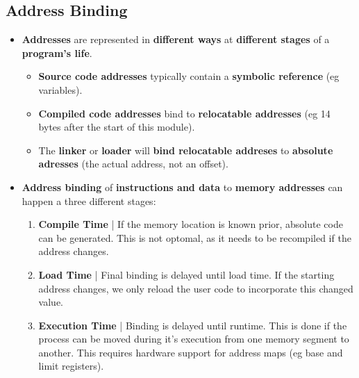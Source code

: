 \documentclass{article}
\begin{document}
    \subsection*{Address Binding}
    \begin{itemize}
        \item \textbf{Addresses} are represented in \textbf{different ways} at \textbf{different stages} of a \textbf{program's life}.
        \begin{itemize}
            \item \textbf{Source code addresses} typically contain a \textbf{symbolic reference} (eg variables).
            \item \textbf{Compiled code addresses} bind to \textbf{relocatable addresses} (eg 14 bytes after the start of this module).
            \item The \textbf{linker} or \textbf{loader} will \textbf{bind relocatable addreses} to \textbf{absolute adresses} (the actual address, not an offset).
        \end{itemize}
        \item \textbf{Address binding} of \textbf{instructions and data} to \textbf{memory addresses} can happen a three different stages:
        \begin{enumerate}
            \item \textbf{Compile Time} | If the memory location is known prior, absolute code can be generated. This is not optomal, as it needs to be recompiled if the address changes.
            \item \textbf{Load Time} | Final binding is delayed until load time. If the starting address changes, we only reload the user code to incorporate this changed value.
            \item \textbf{Execution Time} | Binding is delayed until runtime. This is done if the process can be moved during it's execution from one memory segment to another. This requires hardware support for address maps (eg base and limit registers).
        \end{enumerate}
    \end{itemize}
\end{document}
